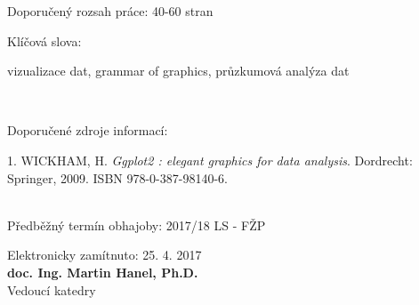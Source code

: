 \documentclass[usenames,dvipsnames,oneside,10.9pt]{article}
\begin{document}
\vspace*{3mm}

\hspace*{-2.7cm} Doporučený rozsah práce: \hspace*{0.8cm} 40-60 stran

\vspace*{3mm}

\hspace*{-2.65cm} Klíčová slova: \hspace*{2.9cm} \parbox[t]{0.95\textwidth}{vizualizace dat, grammar of graphics, průzkumová analýza dat} \\

\vspace*{3mm}

\hspace*{-2.65cm}Doporučené zdroje informací: \\

\hspace*{-2.7cm} \parbox[t]{1.5\textwidth}{\small 1. WICKHAM, H. \textit{Ggplot2 : elegant graphics for data analysis}. Dordrecht: Springer, 2009. ISBN 978-0-387-98140-6.} \\

\hspace*{-2.75cm} Předběžný termín obhajoby: \hspace*{0.1cm} 2017/18 LS - FŽP \\

\vspace*{1mm}

\hspace*{-2cm} \parbox[t]{0.5\textwidth}{\centering Elektronicky zamítnuto: 25. 4. 2017 \\ \textbf{doc. Ing. Martin Hanel, Ph.D.} \\ Vedoucí katedry}
\end{document}
